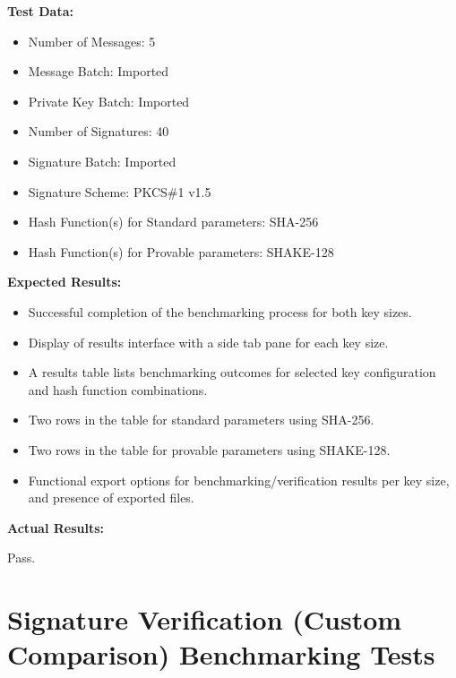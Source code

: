 \documentclass[]{final_report}
\theoremstyle{definition}
\begin{document}
\textbf{Test Data:}
\begin{itemize}
    \item Number of Messages: 5
    \item Message Batch: Imported
    \item Private Key Batch: Imported
     \item Number of Signatures: 40
     \item Signature Batch: Imported
    \item Signature Scheme: PKCS\#1 v1.5
    \item Hash Function(s) for Standard parameters: SHA-256
    \item Hash Function(s) for Provable parameters: SHAKE-128
\end{itemize}

\textbf{Expected Results:}
\begin{itemize}
    \item Successful completion of the benchmarking process for both key sizes.
    \item Display of results interface with a side tab pane for each key size.
    \item A results table lists benchmarking outcomes for selected key configuration and hash function combinations.
    \item Two rows in the table for standard parameters using SHA-256.
    \item Two rows in the table for provable parameters using SHAKE-128.
    \item Functional export options for benchmarking/verification results per key size, and presence of exported files.
\end{itemize}

\textbf{Actual Results:}

Pass.




\section*{Signature Verification (Custom Comparison) Benchmarking Tests} 
\end{document}
